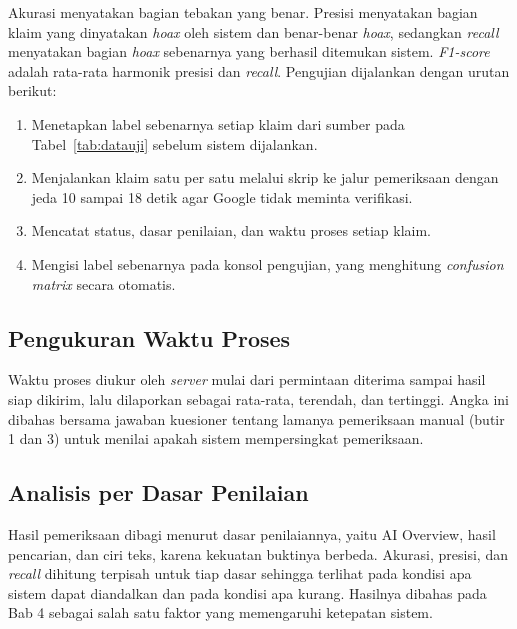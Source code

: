 \documentclass[12pt,a4paper,twoside]{report}
\begin{document}
Akurasi menyatakan bagian tebakan yang benar. Presisi menyatakan bagian klaim yang dinyatakan \textit{hoax} oleh sistem dan benar-benar \textit{hoax}, sedangkan \textit{recall} menyatakan bagian \textit{hoax} sebenarnya yang berhasil ditemukan sistem. \textit{F1-score} adalah rata-rata harmonik presisi dan \textit{recall}. Pengujian dijalankan dengan urutan berikut:
\begin{enumerate}[leftmargin=0.8cm,itemsep=3pt,topsep=2pt]
  \item Menetapkan label sebenarnya setiap klaim dari sumber pada Tabel~\ref{tab:datauji} sebelum sistem dijalankan.
  \item Menjalankan klaim satu per satu melalui skrip ke jalur pemeriksaan dengan jeda 10 sampai 18 detik agar Google tidak meminta verifikasi.
  \item Mencatat status, dasar penilaian, dan waktu proses setiap klaim.
  \item Mengisi label sebenarnya pada konsol pengujian, yang menghitung \textit{confusion matrix} secara otomatis.
\end{enumerate}

\subsection{Pengukuran Waktu Proses}

Waktu proses diukur oleh \textit{server} mulai dari permintaan diterima sampai hasil siap dikirim, lalu dilaporkan sebagai rata-rata, terendah, dan tertinggi. Angka ini dibahas bersama jawaban kuesioner tentang lamanya pemeriksaan manual (butir 1 dan 3) untuk menilai apakah sistem mempersingkat pemeriksaan.

\subsection{Analisis per Dasar Penilaian}

Hasil pemeriksaan dibagi menurut dasar penilaiannya, yaitu AI Overview, hasil pencarian, dan ciri teks, karena kekuatan buktinya berbeda. Akurasi, presisi, dan \textit{recall} dihitung terpisah untuk tiap dasar sehingga terlihat pada kondisi apa sistem dapat diandalkan dan pada kondisi apa kurang. Hasilnya dibahas pada Bab 4 sebagai salah satu faktor yang memengaruhi ketepatan sistem.

\clearpage
{}
{}
\end{document}
